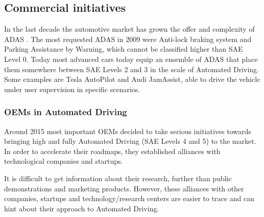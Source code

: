 \subsection{Commercial initiatives}

In the last decade the automotive market has grown the offer and complexity
of ADAS \cite{Perez2016}. The most requested ADAS in 2009
\cite{Frost&Sullivan2010} were Anti-lock braking system and Parking Assistance
by Warning, which cannot be classified higher than SAE Level 0.
Today most advanced cars today equip an ensemble of ADAS that place them
somewhere between SAE Levels 2 and 3 in the scale of Automated Driving. 
Some examples are Tesla AutoPilot and Audi JamAssist, able to
drive the vehicle under user supervision in specific scenarios.  

\subsubsection{OEMs in Automated Driving}
\label{sec:oem-ad}

Around 2015 most important OEMs decided to take serious initiatives towards
bringing high and fully Automated Driving (SAE Levels 4 and 5) to the market.
In order to accelerate their roadmaps, they established alliances with
technological companies and startups.

It is difficult to get information about their research, further than public
demonstrations and marketing products. However, these alliances with other
companies, startups and technology/research centers are easier to trace and can
hint about their approach to Automated Driving.


